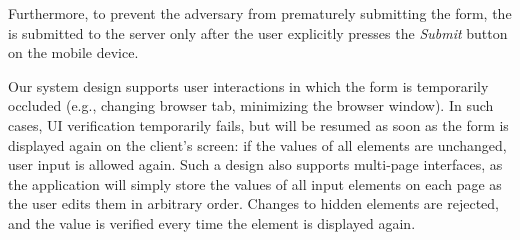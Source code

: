  Furthermore, to prevent the adversary from prematurely submitting the form, the \POI is submitted to the server only after the user explicitly presses the \emph{Submit} button on the mobile device.


Our system design supports user interactions in which the form is temporarily occluded (e.g., changing browser tab, minimizing the browser window).
In such cases, UI verification temporarily fails, but will be resumed as soon as the form is displayed again on the client's screen: if the values of all elements are unchanged, user input is allowed again. Such a design also supports multi-page interfaces, as the application will simply store the values of all input elements on each page as the user edits them in arbitrary order. Changes to hidden elements are rejected, and the value is verified every time the element is displayed again.